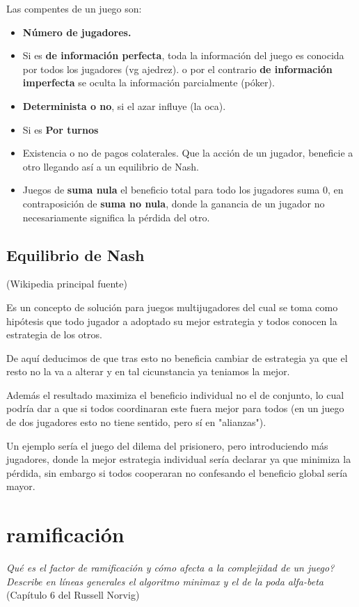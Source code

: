 \documentclass[a4paper]{article}
\begin{document}
Las compentes de un juego son: 

\begin{itemize}
  \item \textbf{Número de jugadores.}
  \item Si es \textbf{de información perfecta}, toda la información del juego es conocida por todos los jugadores (vg ajedrez). 
  o por el contrario \textbf{ de información imperfecta} se oculta la información parcialmente (póker).
  \item \textbf{Determinista o no}, si el azar influye (la oca).
  \item  Si es \textbf{Por turnos}
  \item Existencia o no de pagos colaterales. Que la acción de un jugador, beneficie a otro llegando así a un equilibrio de Nash. 
  \item Juegos de \textbf{suma nula} el beneficio total para todo los jugadores suma 0, en contraposición de \textbf{suma no nula}, 
  donde la ganancia de un jugador no necesariamente significa la pérdida del otro.  
\end{itemize}

\subsection{Equilibrio de Nash}
(Wikipedia principal fuente)

Es un concepto de solución para juegos multijugadores del cual se toma como hipótesis 
que todo jugador a adoptado su mejor estrategia y todos conocen la estrategia de los otros.

De aquí deducimos de que tras esto no beneficia cambiar de estrategia ya que el resto no la va a alterar
y en tal cicunstancia ya teniamos la mejor. 

Además el resultado maximiza el beneficio individual no el de conjunto, lo cual podría dar a que 
si todos coordinaran este fuera mejor para todos (en un juego de dos jugadores esto no tiene sentido, pero sí en "alianzas"). 


Un ejemplo sería el juego del dilema del prisionero, pero introduciendo más jugadores, 
donde la mejor estrategia individual sería declarar ya que minimiza la pérdida, sin embargo 
si todos cooperaran no confesando el beneficio global sería mayor. 

\newpage

\section{ramificación}
\textit{Qué es el factor de ramificación y cómo afecta a la complejidad de un juego? Describe en líneas generales el algoritmo minimax y el de la poda alfa-beta }
(Capítulo 6 del Russell Norvig)
\end{document}
